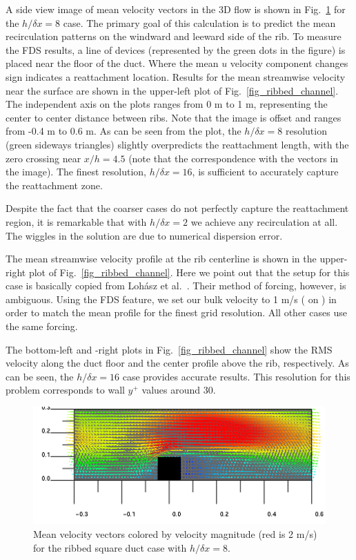\documentclass[11pt]{book}
\begin{document}
A side view image of mean velocity vectors in the 3D flow is shown in Fig.~\ref{fig_ribbed_channel_image} for the $h/\delta x = 8$ case.  The primary goal of this calculation is to predict the mean recirculation patterns on the windward and leeward side of the rib.  To measure the FDS results, a line of devices (represented by the green dots in the figure) is placed near the floor of the duct.  Where the mean $u$ velocity component changes sign indicates a reattachment location.  Results for the mean streamwise velocity near the surface are shown in the upper-left plot of Fig.~\ref{fig_ribbed_channel}.  The independent axis on the plots ranges from 0 m to 1 m, representing the center to center distance between ribs.  Note that the image is offset and ranges from -0.4 m to 0.6 m.  As can be seen from the plot, the $h/\delta x = 8$ resolution (green sideways triangles) slightly overpredicts the reattachment length, with the zero crossing near $x/h = 4.5$ (note that the correspondence with the vectors in the image).  The finest resolution, $h/\delta x=16$, is sufficient to accurately capture the reattachment zone.

Despite the fact that the coarser cases do not perfectly capture the reattachment region, it is remarkable that with $h/\delta x = 2$ we achieve any recirculation at all.  The wiggles in the solution are due to numerical dispersion error.

The mean streamwise velocity profile at the rib centerline is shown in the upper-right plot of Fig.~\ref{fig_ribbed_channel}.  Here we point out that the setup for this case is basically copied from Loh\'asz et al.~\cite{Lohasz:1}.  Their method of forcing, however, is ambiguous.  Using the FDS  feature, we set our bulk velocity to 1 m/s ( on ) in order to match the mean profile for the finest grid resolution.  All other cases use the same forcing.

The bottom-left and -right plots in Fig.~\ref{fig_ribbed_channel} show the RMS velocity along the duct floor and the center profile above the rib, respectively. As can be seen, the $h/\delta x = 16$ case provides accurate results.  This resolution for this problem corresponds to wall $y^+$ values around 30.

\begin{figure}[ht]
\centering
\includegraphics[width=.8\textwidth]{SCRIPT_FIGURES/ribbed_channel_80_s1000}
\caption[The {\ct ribbed\_channel} test case]{Mean velocity vectors colored by velocity magnitude (red is 2 m/s) for the ribbed square duct case with $h/\delta x = 8$.}
\label{fig_ribbed_channel_image}
\end{figure}
\end{document}
